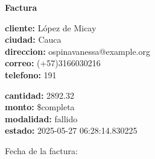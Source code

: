 \documentclass{article}
\begin{document}
\begin{center}
    {\LARGE \textbf{Factura}}\\[1cm]
\end{center}

\textbf{cliente:} López de Micay \\
\textbf{ciudad:} Cauca \\
\textbf{direccion:} ospinavanessa@example.org \\
\textbf{correo:} (+57)3166030216 \\
\textbf{telefono:} 191 \\

\vspace{0.5cm}

\textbf{cantidad:} 2892.32 \\
\textbf{monto:} \$completa \\
\textbf{modalidad:} fallido \\
\textbf{estado:} 2025-05-27 06:28:14.830225 \\

\vspace{1cm}

Fecha de la factura: 
\end{document}
